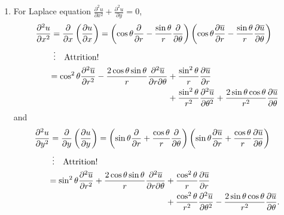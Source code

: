 \documentclass[12pt]{report}
\theoremstyle{definition}
\begin{document}
\begin{enumerate}[label = (\roman*)]
\item For Laplace equation $\frac{\partial^{2}u}{\partial x^{2}} + \frac{\partial^{2}u}{\partial y} = 0$,\[
    \begin{align*}
        \frac{\partial^{2}u}{\partial x^{2}}
        & = \frac{\partial}{\partial x} \left(\frac{\partial u}{\partial x} \right)
        = \left(\cos{\theta} \frac{\partial}{\partial r} 
        - \frac{\sin{\theta}}{r} \frac{\partial}{\partial \theta} \right)
        \left(\cos{\theta} \frac{\partial \overline{u}}{\partial r} 
        - \frac{\sin{\theta}}{r}\frac{\partial \overline{u}}{\partial \theta} \right) \\
        & \;\vdots \quad\textnormal{Attrition!} \\
        & \begin{aligned}[t]
        = \cos^{2}{\theta}\frac{\partial^{2} \overline{u}}{\partial r^{2}} 
        - \frac{2\cos{\theta}\sin{\theta}}{r} \frac{\partial^{2} \overline{u}}{\partial r \partial \theta} 
        & + \frac{\sin^{2}{\theta}}{r} \frac{\partial \overline{u}}{\partial r} \\
        & + \frac{\sin^{2}{\theta}}{r^{2}}\frac{\partial^{2}\overline{u}}{\partial \theta^{2}} 
        + \frac{2\sin{\theta}\cos{\theta}}{r^{2}}\frac{\partial \overline{u}}{\partial \theta}
        \end{aligned}
    \end{align*}
\]and\[
    \begin{align*}
        \frac{\partial^{2}u}{\partial y^{2}}
        & = \frac{\partial}{\partial y} \left(\frac{\partial u}{\partial y} \right)
        = \left(\sin{\theta} \frac{\partial}{\partial r} 
        + \frac{\cos{\theta}}{r} \frac{\partial}{\partial \theta} \right)
        \left(\sin{\theta} \frac{\partial \overline{u}}{\partial r} 
        + \frac{\cos{\theta}}{r}\frac{\partial \overline{u}}{\partial \theta} \right) \\
        & \;\vdots \quad\textnormal{Attrition!} \\
        & \begin{aligned}[t]
        = \sin^{2}{\theta}\frac{\partial^{2} \overline{u}}{\partial r^{2}} 
        + \frac{2\cos{\theta}\sin{\theta}}{r} \frac{\partial^{2} \overline{u}}{\partial r \partial \theta} 
        & + \frac{\cos^{2}{\theta}}{r} \frac{\partial \overline{u}}{\partial r} \\
        & + \frac{\cos^{2}{\theta}}{r^{2}}\frac{\partial^{2}\overline{u}}{\partial \theta^{2}} 
        - \frac{2\sin{\theta}\cos{\theta}}{r^{2}}\frac{\partial \overline{u}}{\partial \theta}.

\end{aligned}
\end{align*}\]
\end{enumerate}
\end{document}
